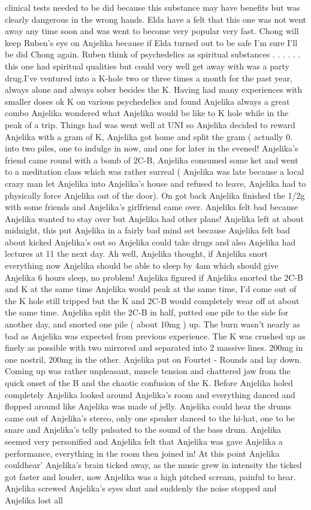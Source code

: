 \documentclass[12pt]{book}
\begin{document}
clinical tests needed to be did because this substance may have benefits but was clearly dangerous in the wrong hands. Elda have a felt that this one was not went away any time soon and was went to become very popular very fast. Chong will keep Ruben's eye on Anjelika because if Elda turned out to be safe I'm sure I'll be did Chong again. Ruben think of psychedelics as spiritual substances . . .  . . .  this one had spiritual qualities but could very well get away with was a party drug.I've ventured into a K-hole two or three times a month for the past year, always alone and always sober besides the K. Having had many experiences with smaller doses ok K on various psychedelics and found Anjelika always a great combo Anjelika wondered what Anjelika would be like to K hole while in the peak of a trip. Things had was went well at UNI so Anjelika decided to reward Anjelika with a gram of K, Anjelika got home and split the gram ( actually 0. into two piles, one to indulge in now, and one for later in the evened! Anjelika's friend came round with a bomb of 2C-B, Anjelika consumed some ket and went to a meditation class which was rather surreal ( Anjelika was late because a local crazy man let Anjelika into Anjelika's house and refused to leave, Anjelika had to physically force Anjelika out of the door). On got back Anjelika finished the 1/2g with some friends and Anjelika's girlfriend came over. Anjelika felt bad because Anjelika wanted to stay over but Anjelika had other plans! Anjelika left at about midnight, this put Anjelika in a fairly bad mind set because Anjelika felt bad about kicked Anjelika's out so Anjelika could take drugs and also Anjelika had lectures at 11 the next day. Ah well, Anjelika thought, if Anjelika snort everything now Anjelika should be able to sleep by 4am which should give Anjelika 6 hours sleep, no problem! Anjelika figured if Anjelika snorted the 2C-B and K at the same time Anjelika would peak at the same time, I'd come out of the K hole still tripped but the K and 2C-B would completely wear off at about the same time. Anjelika split the 2C-B in half, putted one pile to the side for another day, and snorted one pile ( about 10mg ) up. The burn wasn't nearly as bad as Anjelika was expected from previous experience. The K was crushed up as finely as possible with two mirrored and separated into 2 massive lines. 200mg in one nostril, 200mg in the other. Anjelika put on Fourtet - Rounds and lay down. Coming up was rather unpleasant, muscle tension and chattered jaw from the quick onset of the B and the chaotic confusion of the K. Before Anjelika holed completely Anjelika looked around Anjelika's room and everything danced and flopped around like Anjelika was made of jelly. Anjelika could hear the drums came out of Anjelika's stereo, only one speaker danced to the hi-hat, one to be snare and Anjelika's telly pulsated to the sound of the bass drum. Anjelika seemed very personified and Anjelika felt that Anjelika was gave Anjelika a performance, everything in the room then joined in! At this point Anjelika couldhear' Anjelika's brain ticked away, as the music grew in intensity the ticked got faster and louder, now Anjelika was a high pitched scream, painful to hear. Anjelika screwed Anjelika's eyes shut and suddenly the noise stopped and Anjelika lost all 
\end{document}

